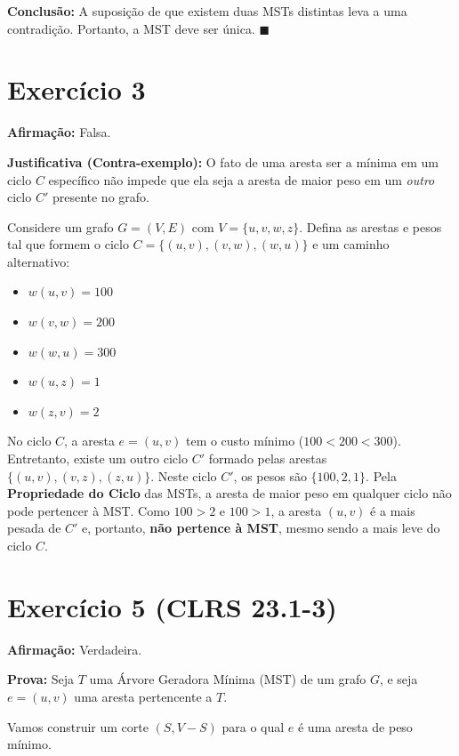 \documentclass[a4paper,12pt]{article}
\begin{document}
\textbf{Conclusão:} A suposição de que existem duas MSTs distintas leva a uma contradição. Portanto, a MST deve ser única. $\blacksquare$
\newpage
\newpage
\section*{Exercício 3}

\textbf{Afirmação:} Falsa.

\textbf{Justificativa (Contra-exemplo):}
O fato de uma aresta ser a mínima em um ciclo $C$ específico não impede que ela seja a aresta de maior peso em um \textit{outro} ciclo $C'$ presente no grafo.

Considere um grafo $G = (V, E)$ com $V = \{u, v, w, z\}$.
Defina as arestas e pesos tal que formem o ciclo $C = \{(u,v), (v,w), (w,u)\}$ e um caminho alternativo:
\begin{itemize}
    \item $w(u, v) = 100$
    \item $w(v, w) = 200$
    \item $w(w, u) = 300$
    \item $w(u, z) = 1$
    \item $w(z, v) = 2$
\end{itemize}

No ciclo $C$, a aresta $e = (u, v)$ tem o custo mínimo ($100 < 200 < 300$).
Entretanto, existe um outro ciclo $C'$ formado pelas arestas $\{(u,v), (v,z), (z,u)\}$. Neste ciclo $C'$, os pesos são $\{100, 2, 1\}$.
Pela \textbf{Propriedade do Ciclo} das MSTs, a aresta de maior peso em qualquer ciclo não pode pertencer à MST. Como $100 > 2$ e $100 > 1$, a aresta $(u, v)$ é a mais pesada de $C'$ e, portanto, \textbf{não pertence à MST}, mesmo sendo a mais leve do ciclo $C$.

\newpage
\section*{Exercício 5 (CLRS 23.1-3)}

\textbf{Afirmação:} Verdadeira.

\textbf{Prova:}
Seja $T$ uma Árvore Geradora Mínima (MST) de um grafo $G$, e seja $e = (u, v)$ uma aresta pertencente a $T$.

Vamos construir um corte $(S, V-S)$ para o qual $e$ é uma aresta de peso mínimo.
\end{document}
